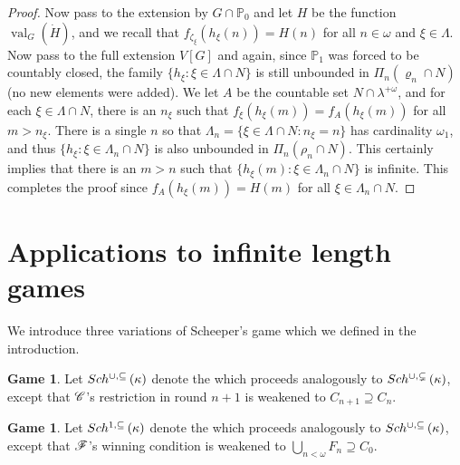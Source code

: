 \documentclass{rmmcart}
\theoremstyle{plain}
\theoremstyle{definition}
\newtheorem{game}[theorem]{Game}
\theoremstyle{remark}
\theoremstyle{plain}
\theoremstyle{definition}
\theoremstyle{remark}
\begin{document}
\begin{proof}
            Now pass to the extension by
                  $G\cap \mathbb P_0$ and let $H$ be the function
                   $\operatorname{val}_{G}(\dot H)$, and we recall
                   that $f_{\zeta_\xi}(h_\xi(n)) = H(n)$ for all $n\in \omega$
            and $\xi\in \Lambda$.
             Now pass to the full extension $V[G]$ and again, since
              $\mathbb P_1$ was forced to be countably closed,
               the family $\{ h_\xi : \xi \in \Lambda\cap N\}$ is still
               unbounded in $\Pi_n (\varrho_n \cap N)$ (no new elements
            were added). We let
               $A$ be the countable set $N\cap \lambda^{+\omega}$,
               and for  each
               $\xi\in \Lambda\cap N$, there is an $n_\xi$ such that
                $f_{\xi}(h_\xi(m)) = f_A(h_\xi(m))$ for all $m>n_\xi$.
                There is a single $n$ so that $\Lambda_n
                 = \{\xi\in \Lambda\cap N       : n_\xi = n\}$ has cardinality
                  $\omega_1 $, and thus
                  $\{ h_\xi : \xi\in \Lambda_n\cap N\}$ is also unbounded
                  in $\Pi_n (\rho_n\cap N)$.
            This certainly implies that there is an $m>n$
            such that $\{ h_\xi (m) : \xi\in \Lambda_n\cap N\}$ is infinite.
            This completes the proof since  $f_{A}(h_\xi(m)) = H(m)$
            for all $\xi\in \Lambda_n\cap N$.
            \end{proof}





  \section{Applications to infinite length games}

  We introduce three variations of Scheeper's game which we defined in
  the introduction.

  \begin{game}
    Let \(Sch^{\cup,\subseteq}\left({\kappa}\right)\) denote the
     which proceeds analogously
    to \(Sch^{\cup,\subsetneq}\left({\kappa}\right)\), except that \(\mathscr{C}\)'s restriction in round \(n+1\)
    is weakened to \(C_{n+1}\supseteq C_n\).
  \end{game}

  \begin{game}
    Let \(Sch^{1,\subseteq}\left({\kappa}\right)\) denote the
     which proceeds analogously
    to \(Sch^{\cup,\subseteq}\left({\kappa}\right)\), except that \(\mathscr{F}\)'s winning condition is
    weakened to \(\bigcup_{n<\omega}F_n\supseteq C_0\).
  \end{game}
\end{document}
